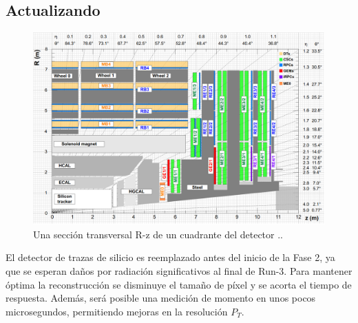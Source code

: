 %
%

\subsection{Actualizando \CMS}


\begin{figure}[!h]
\centering
\includegraphics[width=.95\textwidth]{Cap2/imagenes/camaraZ.png}
\caption[Una sección transversal R-z de un cuadrante del detector \CMS.]{Una sección transversal R-z de un cuadrante del detector \CMS.\footnotemark.}
\label{transversal}
\end{figure}
El detector de trazas de silicio %
es reemplazado antes del inicio de la Fase 2, ya que se esperan daños por radiación significativos al final de Run-3. Para mantener óptima la reconstrucción se disminuye el tamaño de píxel y se acorta el tiempo de respuesta. Además, será posible una medición de momento en unos pocos microsegundos, permitiendo mejoras en la resolución $P_T$. %

